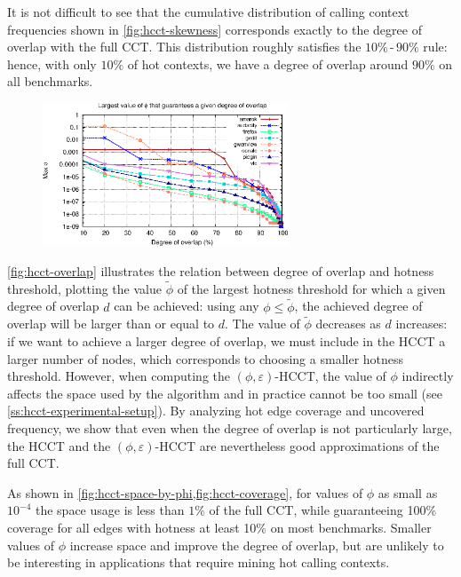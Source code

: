 It is not difficult to see that the cumulative distribution  of calling context frequencies shown in \myfigure\ref{fig:hcct-skewness}  corresponds exactly to the degree of overlap with the full CCT. This distribution roughly satisfies the $10\%\,$-$\,90\%$ rule: hence, with only $10\%$ of hot contexts, we have a degree of overlap around $90\%$ on all benchmarks.

\ifdefined\noauthorea
\begin{figure}[!ht]
\begin{center}
\includegraphics[width=0.65\textwidth]{figures/hcct-overlap/hcct-overlap.eps}
\caption{\protect}
\end{center}
\end{figure}
\fi

\noindent \myfigure\ref{fig:hcct-overlap} illustrates the relation between degree of overlap and hotness threshold, plotting the value $\widetilde\phi$ of the largest hotness threshold for which a given degree of overlap $d$ can be achieved: using any $\phi\leq\widetilde\phi$, the achieved degree of overlap will be larger than or equal to $d$. The value of $\widetilde\phi$ decreases as $d$ increases: if we want to achieve a larger degree of overlap, we must include in the HCCT a larger number of nodes, which corresponds to choosing a smaller hotness threshold. However, when computing the $(\phi,\varepsilon)$-HCCT, the value of $\phi$ indirectly affects the space used by the algorithm and in practice cannot be too small (see \mysection\ref{ss:hcct-experimental-setup}). By analyzing hot edge coverage and uncovered frequency, we show that even when the degree of overlap is not particularly large, the HCCT and the $(\phi,\varepsilon)$-HCCT are nevertheless good approximations of the full CCT.

As shown in \myfigure\ref{fig:hcct-space-by-phi,fig:hcct-coverage}, for values of $\phi$ as small as $10^{-4}$ the space usage is less than $1\%$ of the full CCT, while guaranteeing 100\% coverage for all edges with hotness at least 10\% on most benchmarks. Smaller values of $\phi$ increase space and improve the degree of overlap, but are unlikely to be interesting in applications that require mining hot calling contexts.

